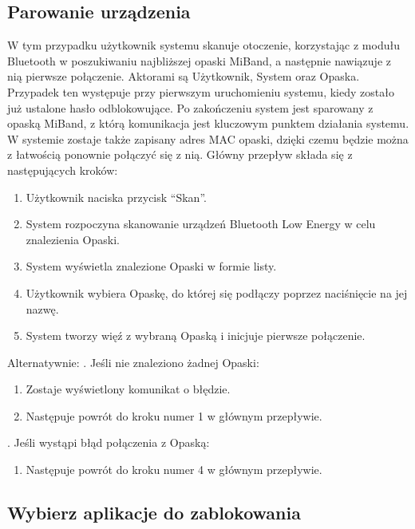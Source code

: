 \subsection{Parowanie urządzenia}
W tym przypadku użytkownik systemu skanuje otoczenie, korzystając z modułu Bluetooth w poszukiwaniu najbliższej opaski MiBand, a następnie nawiązuje z nią pierwsze połączenie. Aktorami są Użytkownik, System oraz Opaska. Przypadek ten występuje przy pierwszym uruchomieniu systemu, kiedy zostało już ustalone hasło odblokowujące. Po zakończeniu system jest sparowany z opaską MiBand, z którą komunikacja jest kluczowym punktem działania systemu. W systemie zostaje także zapisany adres MAC opaski, dzięki czemu będzie można z łatwością ponownie połączyć się z nią. Główny przepływ składa się z następujących kroków:
\begin{enumerate}
    \item Użytkownik naciska przycisk ``Skan''.
    \item System rozpoczyna skanowanie urządzeń Bluetooth Low Energy w celu znalezienia Opaski.
    \item System wyświetla znalezione Opaski w formie listy. 
    \item Użytkownik wybiera Opaskę, do której się podłączy poprzez naciśnięcie na jej nazwę.
    \item System tworzy więź z wybraną Opaską i inicjuje pierwsze połączenie.
\end{enumerate}
Alternatywnie:
\newline\newline
{}. Jeśli nie znaleziono żadnej Opaski:
\begin{enumerate}[leftmargin=3\parindent]
    \item Zostaje wyświetlony komunikat o błędzie.
    \item Następuje powrót do kroku numer 1 w głównym przepływie.
\end{enumerate}
\quad\newline
{}. Jeśli wystąpi błąd połączenia z Opaską:
\begin{enumerate}[leftmargin=3\parindent]
    \item Następuje powrót do kroku numer 4 w głównym przepływie.
\end{enumerate}

\subsection{Wybierz aplikacje do zablokowania}

